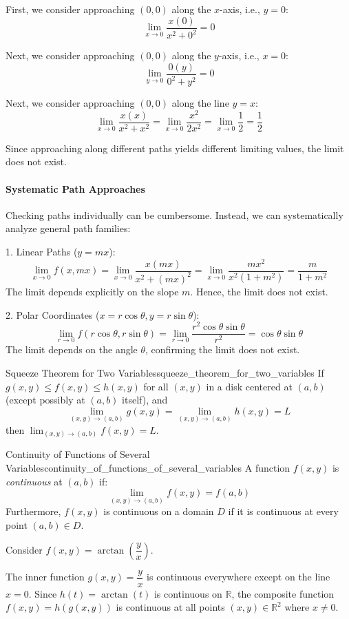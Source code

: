 \begin{sol}
First, we consider approaching $(0, 0)$ along the $x$-axis, i.e., $y = 0$:
\[
\lim_{x \to 0}{\frac{x(0)}{x^2 + 0^2}} = 0
\]

Next, we consider approaching $(0, 0)$ along the $y$-axis, i.e., $x = 0$:
\[
\lim_{y \to 0}{\frac{0(y)}{0^2 + y^2}} = 0
\]

Next, we consider approaching $(0, 0)$ along the line $y = x$:
\[
\lim_{x \to 0}{\frac{x(x)}{x^2 + x^2}} = \lim_{x \to 0}{\frac{x^2}{2x^2}} = \lim_{x \to 0}{\frac{1}{2}} = \frac{1}{2}
\]

Since approaching along different paths yields different limiting values, the limit does not exist.

\paragraph{Systematic Path Approaches} Checking paths individually can be cumbersome. Instead, we can systematically analyze general path families:

1. Linear Paths ($y = mx$):
   \[
   \lim_{x \to 0}{f(x, mx)} = \lim_{x \to 0}{\frac{x(mx)}{x^2 + (mx)^2}} = \lim_{x \to 0}{\frac{mx^2}{x^2(1 + m^2)}} = \frac{m}{1 + m^2}
   \]
   The limit depends explicitly on the slope $m$. Hence, the limit does not exist.

2. Polar Coordinates ($x = r\cos\theta, y = r\sin\theta$):
   \[
   \lim_{r \to 0}{f(r \cos \theta, r \sin \theta)} = \lim_{r \to 0}{\dfrac{r^2 \cos\theta\sin\theta}{r^2}} = \cos\theta\sin\theta
   \]
   The limit depends on the angle $\theta$, confirming the limit does not exist.
\end{sol}

\begin{definition}{Squeeze Theorem for Two Variables}{squeeze_theorem_for_two_variables}
If $g(x, y) \leq f(x, y) \leq h(x, y)$ for all $(x, y)$ in a disk centered at $(a, b)$ (except possibly at $(a, b)$ itself), and 
\[
\lim_{(x, y) \to (a, b)} g(x, y) = \lim_{(x, y) \to (a, b)} h(x, y) = L
\]
then $\lim_{(x, y) \to (a, b)} f(x, y) = L$.
\end{definition}

\begin{definition}{Continuity of Functions of Several Variables}{continuity_of_functions_of_several_variables}
A function $f(x, y)$ is \textit{continuous} at $(a, b)$ if:
\[
\lim_{(x, y) \to (a, b)} f(x, y) = f(a, b)
\]
Furthermore, $f(x, y)$ is continuous on a domain $D$ if it is continuous at every point $(a, b) \in D$.
\end{definition}

\begin{example}
Consider $f(x,y) = \arctan\left(\dfrac{y}{x}\right)$. 

The inner function $g(x,y) = \dfrac{y}{x}$ is continuous everywhere except on the line $x = 0$. Since $h(t) = \arctan(t)$ is continuous on $\mathbb{R}$, the composite function $f(x,y) = h(g(x,y))$ is continuous at all points $(x,y) \in \mathbb{R}^2$ where $x \neq 0$.
\end{example}